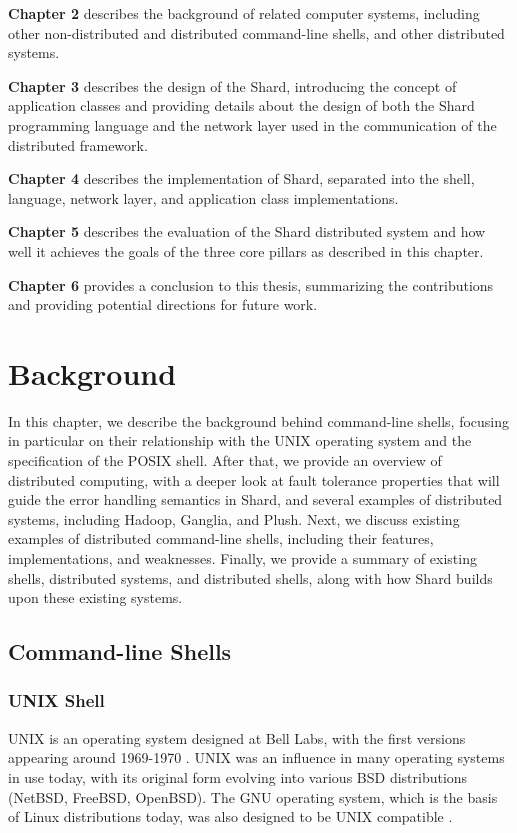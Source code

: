 \documentclass[twoside]{report}
\begin{document}
\begin{sloppypar}
  \textbf{Chapter 2} describes the background of related computer systems, including other non-distributed and distributed command-line shells, and other distributed systems.
\end{sloppypar}

\textbf{Chapter 3} describes the design of the Shard, introducing the concept of application classes and providing details about the design of both the Shard programming language and the network layer used in the communication of the distributed framework.

\textbf{Chapter 4} describes the implementation of Shard, separated into the shell, language, network layer, and application class implementations.

\textbf{Chapter 5} describes the evaluation of the Shard distributed system and how well it achieves the goals of the three core pillars as described in this chapter.

\textbf{Chapter 6} provides a conclusion to this thesis, summarizing the contributions and providing potential directions for future work.


\chapter{Background}

In this chapter, we describe the background behind command-line shells, focusing in particular on their relationship with the UNIX operating system and the specification of the POSIX shell.
After that, we provide an overview of distributed computing, with a deeper look at fault tolerance properties that will guide the error handling semantics in Shard, and several examples of distributed systems, including Hadoop, Ganglia, and Plush.
Next, we discuss existing examples of distributed command-line shells, including their features, implementations, and weaknesses.
Finally, we provide a summary of existing shells, distributed systems, and distributed shells, along with how Shard builds upon these existing systems.

\section{Command-line Shells}
\subsection{UNIX Shell}
UNIX is an operating system designed at Bell Labs, with the first versions appearing around 1969-1970 \cite{10.1145/361011.361061}.
UNIX was an influence in many operating systems in use today, with its original form evolving into various BSD distributions (NetBSD, FreeBSD, OpenBSD). The GNU operating system, which is the basis of Linux distributions today, was also designed to be UNIX compatible \cite{bretthauer2001open}.
\end{document}

